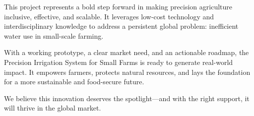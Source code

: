 \documentclass{IEEEtran}
\begin{document}
This project represents a bold step forward in making precision agriculture inclusive, effective, and scalable. It leverages low-cost technology and interdisciplinary knowledge to address a persistent global problem: inefficient water use in small-scale farming.

With a working prototype, a clear market need, and an actionable roadmap, the Precision Irrigation System for Small Farms is ready to generate real-world impact. It empowers farmers, protects natural resources, and lays the foundation for a more sustainable and food-secure future.

We believe this innovation deserves the spotlight—and with the right support, it will thrive in the global market.
\end{document}
